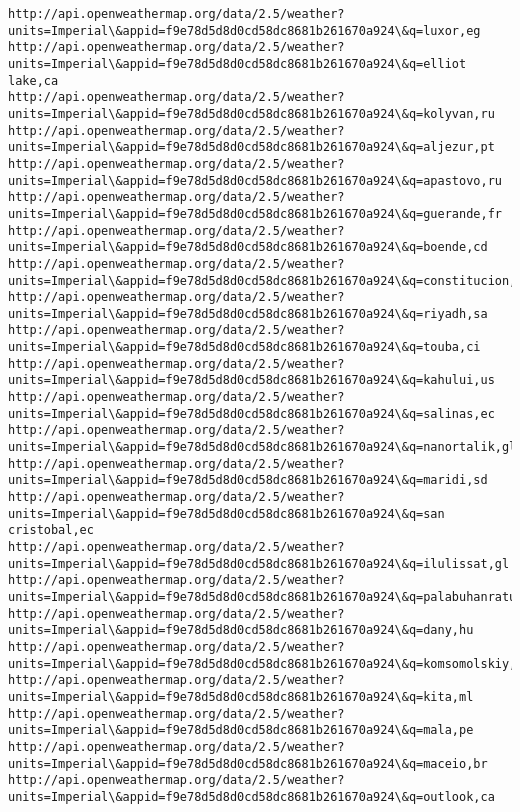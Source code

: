 \documentclass[11pt]{article}
\begin{document}
\begin{Verbatim}[commandchars=\\\{\}]
http://api.openweathermap.org/data/2.5/weather?units=Imperial\&appid=f9e78d5d8d0cd58dc8681b261670a924\&q=luxor,eg
http://api.openweathermap.org/data/2.5/weather?units=Imperial\&appid=f9e78d5d8d0cd58dc8681b261670a924\&q=elliot lake,ca
http://api.openweathermap.org/data/2.5/weather?units=Imperial\&appid=f9e78d5d8d0cd58dc8681b261670a924\&q=kolyvan,ru
http://api.openweathermap.org/data/2.5/weather?units=Imperial\&appid=f9e78d5d8d0cd58dc8681b261670a924\&q=aljezur,pt
http://api.openweathermap.org/data/2.5/weather?units=Imperial\&appid=f9e78d5d8d0cd58dc8681b261670a924\&q=apastovo,ru
http://api.openweathermap.org/data/2.5/weather?units=Imperial\&appid=f9e78d5d8d0cd58dc8681b261670a924\&q=guerande,fr
http://api.openweathermap.org/data/2.5/weather?units=Imperial\&appid=f9e78d5d8d0cd58dc8681b261670a924\&q=boende,cd
http://api.openweathermap.org/data/2.5/weather?units=Imperial\&appid=f9e78d5d8d0cd58dc8681b261670a924\&q=constitucion,cl
http://api.openweathermap.org/data/2.5/weather?units=Imperial\&appid=f9e78d5d8d0cd58dc8681b261670a924\&q=riyadh,sa
http://api.openweathermap.org/data/2.5/weather?units=Imperial\&appid=f9e78d5d8d0cd58dc8681b261670a924\&q=touba,ci
http://api.openweathermap.org/data/2.5/weather?units=Imperial\&appid=f9e78d5d8d0cd58dc8681b261670a924\&q=kahului,us
http://api.openweathermap.org/data/2.5/weather?units=Imperial\&appid=f9e78d5d8d0cd58dc8681b261670a924\&q=salinas,ec
http://api.openweathermap.org/data/2.5/weather?units=Imperial\&appid=f9e78d5d8d0cd58dc8681b261670a924\&q=nanortalik,gl
http://api.openweathermap.org/data/2.5/weather?units=Imperial\&appid=f9e78d5d8d0cd58dc8681b261670a924\&q=maridi,sd
http://api.openweathermap.org/data/2.5/weather?units=Imperial\&appid=f9e78d5d8d0cd58dc8681b261670a924\&q=san cristobal,ec
http://api.openweathermap.org/data/2.5/weather?units=Imperial\&appid=f9e78d5d8d0cd58dc8681b261670a924\&q=ilulissat,gl
http://api.openweathermap.org/data/2.5/weather?units=Imperial\&appid=f9e78d5d8d0cd58dc8681b261670a924\&q=palabuhanratu,id
http://api.openweathermap.org/data/2.5/weather?units=Imperial\&appid=f9e78d5d8d0cd58dc8681b261670a924\&q=dany,hu
http://api.openweathermap.org/data/2.5/weather?units=Imperial\&appid=f9e78d5d8d0cd58dc8681b261670a924\&q=komsomolskiy,ru
http://api.openweathermap.org/data/2.5/weather?units=Imperial\&appid=f9e78d5d8d0cd58dc8681b261670a924\&q=kita,ml
http://api.openweathermap.org/data/2.5/weather?units=Imperial\&appid=f9e78d5d8d0cd58dc8681b261670a924\&q=mala,pe
http://api.openweathermap.org/data/2.5/weather?units=Imperial\&appid=f9e78d5d8d0cd58dc8681b261670a924\&q=maceio,br
http://api.openweathermap.org/data/2.5/weather?units=Imperial\&appid=f9e78d5d8d0cd58dc8681b261670a924\&q=outlook,ca

\end{Verbatim}
\end{document}
